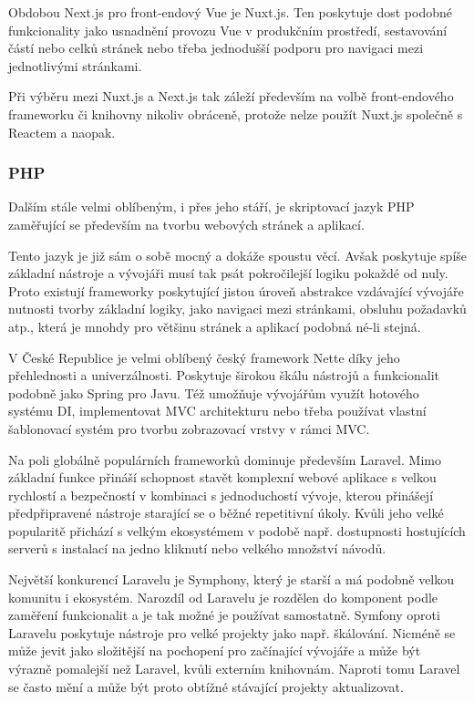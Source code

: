 		Obdobou Next.js pro front-endový Vue je Nuxt.js.
		Ten poskytuje dost podobné funkcionality jako usnadnění provozu Vue v produkčním prostředí, sestavování
		částí nebo celků stránek nebo třeba jednodušší podporu pro navigaci mezi jednotlivými stránkami. \cite{nuxtjs}

		Při výběru mezi Nuxt.js a Next.js tak záleží především na volbě front-endového frameworku či knihovny
		nikoliv obráceně, protože nelze použít Nuxt.js společně s Reactem a naopak.

		\subsubsection{PHP}

		Dalším stále velmi oblíbeným, i přes jeho stáří, je skriptovací jazyk \noindent\Ac{PHP} zaměřující se především na tvorbu
		webových stránek a aplikací. \cite{php}

		Tento jazyk je již sám o sobě mocný a dokáže spoustu věcí.
		Avšak poskytuje spíše základní nástroje a vývojáři musí tak psát pokročilejší logiku pokaždé od nuly.
		Proto existují frameworky poskytující jistou úroveň abstrakce vzdávající vývojáře nutnosti tvorby základní logiky,
		jako navigaci mezi stránkami, obsluhu požadavků atp., která je mnohdy pro většinu stránek a aplikací podobná
		né-li stejná. \cite{best_php_frameworks}

		V České Republice je velmi oblíbený český framework Nette díky jeho přehlednosti a univerzálnosti.
		Poskytuje širokou škálu nástrojů a funkcionalit podobně jako Spring pro Javu.
		Též umožňuje vývojářům využít hotového systému \Ac{DI}, implementovat \Ac{MVC} architekturu nebo třeba používat
		vlastní šablonovací systém pro tvorbu zobrazovací vrstvy v rámci \Ac{MVC}. \cite{proc_pouzivat_nette}

		Na poli globálně populárních frameworků dominuje především Laravel.
		Mimo základní funkce přináší schopnost stavět komplexní webové aplikace s velkou rychlostí a bezpečností
		v kombinaci s jednoduchostí vývoje, kterou přinášejí předpřipravené nástroje starající se o běžné repetitivní
		úkoly.
		Kvůli jeho velké popularitě přichází s velkým ekosystémem v podobě např. dostupnosti hostujících serverů
		s instalací na jedno kliknutí nebo velkého množství návodů. \cite{best_php_frameworks}

		Největší konkurencí Laravelu je Symphony, který je starší a má podobně velkou komunitu i ekosystém.
		Narozdíl od Laravelu je rozdělen do komponent podle zaměření funkcionalit a je tak možné je používat samostatně. \cite{best_php_frameworks}
		Symfony oproti Laravelu poskytuje nástroje pro velké projekty jako např. škálování.
		Nicméně se může jevit jako složitější na pochopení pro začínající vývojáře a může být výrazně pomalejší
		než Laravel, kvůli externím knihovnám.
		Naproti tomu Laravel se často mění a může být proto obtížné stávající projekty aktualizovat.
		\cite{laravel_vs_symfony_in_2021}

